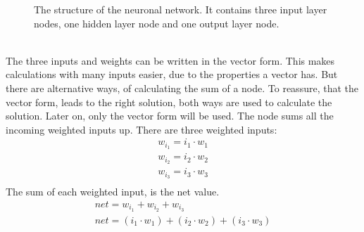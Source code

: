 \documentclass[12pt]{article}
\begin{document}
\begin{figure}[h]
\caption{The structure of the neuronal network. It contains three \gls{input layer} nodes, one \gls{hidden layer} node and one \gls{output layer} node.}
\label{networkexample}
\end{figure}\\
The three inputs and weights can be written in the vector form. This makes calculations with many inputs easier, due to the properties a vector has. But there are alternative ways, of calculating the sum of a node. To reassure, that the vector form, leads to the right solution, both ways are used to calculate the solution. Later on, only the vector form will be used. The node sums all the incoming weighted inputs up. There are three weighted inputs:
\begin{equation}\nonumber
\begin{gathered}
w_{i_{1}} = i_{1} \cdot w_{1}\\
w_{i_{2}} = i_{2} \cdot w_{2}\\
w_{i_{3}} = i_{3} \cdot w_{3}\\
\end{gathered}
\end{equation}
The sum of each weighted input, is the net value.
\begin{equation}\nonumber
\begin{gathered}
net = w_{i_{1}} + w_{i_{2}} + w_{i_{3}}\\
net = ( i_{1} \cdot w_{1} ) +( i_{2} \cdot w_{2}) + ( i_{3} \cdot w_{3})\\
\end{gathered}
\end{equation}
\end{document}
